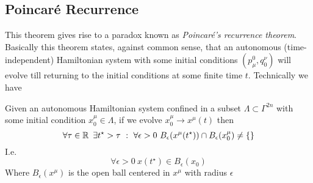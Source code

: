 \documentclass[../admech.tex]{subfiles}
\begin{document}
\subsection{Poincaré Recurrence}
This theorem gives rise to a paradox known as \textit{Poincaré's recurrence theorem}. Basically this theorem states, against common sense, that an autonomous (time-independent) Hamiltonian system with some initial conditions $(p_\mu^0,q^\nu_0)$ will evolve till returning to the initial conditions at some finite time $t$. Technically we have
\begin{thm}
	Given an autonomous Hamiltonian system confined in a subset $\Lambda\subset\Gamma^{2n}$ with some initial condition $x_0^\mu\in\Lambda$, if we evolve $x_0^\mu\to x^\mu(t)$ then
	\begin{equation*}
		\forall\tau\in\R\ \exists t^{\star}>\tau\ :\ \forall\epsilon>0\ B_\epsilon(x^\mu(t^\star))\cap B_\epsilon(x_0^\mu)\ne\{\}
	\end{equation*}
	I.e.
	\begin{equation*}
		\forall\epsilon>0\ x(t^\star)\in B_\epsilon(x_0)
	\end{equation*}
	Where $B_\epsilon(x^\mu)$ is the open ball centered in $x^\mu$ with radius $\epsilon$
\end{thm}
\end{document}
